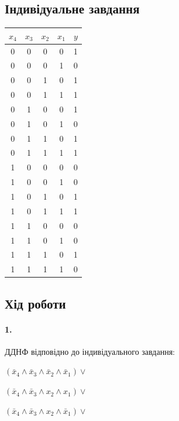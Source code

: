 \documentclass[12pt]{extarticle}
\begin{document}
\vspace{12pt}

\subsection*{Індивідуальне завдання}

\begin{center}
    \begin{tabular}{| c | c | c | c | c |}
    \hline
    $x_4$ & $x_3$ & $x_2$ & $x_1$ & $y$\\
    \hline
    0 & 0 & 0 & 0 & 1\\
    \hline
    0 & 0 & 0 & 1 & 0\\
    \hline
    0 & 0 & 1 & 0 & 1\\
    \hline
    0 & 0 & 1 & 1 & 1\\
    \hline
    0 & 1 & 0 & 0 & 1\\
    \hline
    0 & 1 & 0 & 1 & 0\\
    \hline
    0 & 1 & 1 & 0 & 1\\
    \hline
    0 & 1 & 1 & 1 & 1\\
    \hline
    1 & 0 & 0 & 0 & 0\\
    \hline
    1 & 0 & 0 & 1 & 0\\
    \hline
    1 & 0 & 1 & 0 & 1\\
    \hline
    1 & 0 & 1 & 1 & 1\\
    \hline
    1 & 1 & 0 & 0 & 0\\
    \hline
    1 & 1 & 0 & 1 & 0\\
    \hline
    1 & 1 & 1 & 0 & 1\\
    \hline
    1 & 1 & 1 & 1 & 0\\
    \hline
    \end{tabular}
\end{center}

\subsection*{Хід роботи}
\paragraph{1.}
ДДНФ відповідно до індивідуального завдання:

$( \bar x_4 \land \bar x_3 \land \bar x_2 \land \bar x_1) \lor$

$( \bar x_4 \land \bar x_3 \land  x_2 \land x_1) \lor$

$( \bar x_4 \land \bar x_3 \land x_2 \land \bar x_1) \lor$
\end{document}
